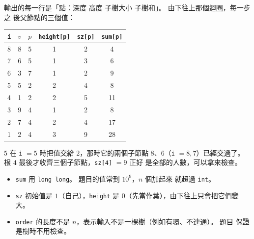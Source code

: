 
輸出的每一行是「點：深度 高度 子樹大小 子樹和」。 由下往上那個迴圈，每一步之
後父節點的三個值：

\begin{center}
\begin{tabular}{cccccc}
\toprule
\texttt{i} & $v$ & $p$ & \texttt{height[p]} & \texttt{sz[p]} & \texttt{sum[p]} \\
\midrule
8 & 8 & 5 & 1 & 2 & 4 \\
7 & 6 & 5 & 1 & 3 & 6 \\
6 & 3 & 7 & 1 & 2 & 9 \\
5 & 5 & 2 & 2 & 4 & 8 \\
4 & 1 & 2 & 2 & 5 & 11 \\
3 & 9 & 4 & 1 & 2 & 8 \\
2 & 7 & 4 & 2 & 4 & 17 \\
1 & 2 & 4 & 3 & 9 & 28 \\
\bottomrule
\end{tabular}
\end{center}

$5$ 在 \texttt{i} $= 5$ 時把值交給 $2$，那時它的兩個子節點 $8$、$6$（\texttt{i}
$= 8, 7$）已經交過了。 根 $4$ 最後才收齊三個子節點，\texttt{sz[4]} $= 9$ 正好
是全部的人數，可以拿來檢查。

\begin{itemize}
\item \texttt{sum} 用 \texttt{long long}。 題目的值常到 $10^9$，$n$ 個加起來
就超過 \texttt{int}。
\item \texttt{sz} 初始值是 $1$（自己），\texttt{height} 是 $0$（先當作葉），由下往上只會把它們變大。
\item \texttt{order} 的長度不是 $n$，表示輸入不是一棵樹（例如有環、不連通）。 題目
保證是樹時不用檢查。
\end{itemize}

